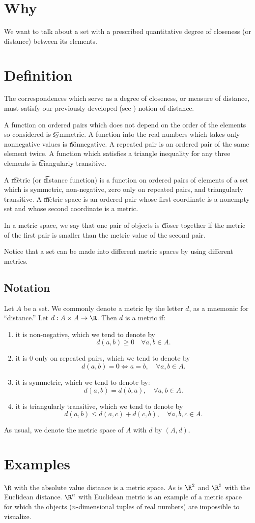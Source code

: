 
\section*{Why}

We want to talk about a set with a prescribed quantitative degree of closeness (or distance) between its elements.

\section*{Definition}

The correspondences which serve as a degree of closeness, or measure of distance, must satisfy our previously developed (see ) notion of distance.

A function on ordered pairs which does not depend on the order of the elements so considered is \t{symmetric}.
A function into the real numbers which takes only nonnegative values is \t{nonnegative}.
A repeated pair is an ordered pair of the same element twice.
A function which satisfies a triangle inequality for any three elements is \t{triangularly transitive}.

A \t{metric} (or \t{distance function}) is a function on ordered pairs of elements of a set which is symmetric, non-negative, zero only on repeated pairs, and triangularly transitive.
A \t{metric space} is an ordered pair whose first coordinate is a nonempty set and whose second coordinate is a metric.

In a metric space, we say that one pair of objects is \t{closer} together if the metric of the first pair is smaller than the metric value of the second pair.

Notice that a set can be made into different metric spaces by using different metrics.

\subsection*{Notation}

Let $A$ be a set.
We commonly denote a metric by the letter $d$, as a mnemonic for ``distance.''
Let $d: A \times  A \to \R $.
Then $d$ is a metric if:
    \begin{enumerate}
      \item it is non-negative, which we tend to denote by
\[
d(a, b) \geq 0 \quad \forall a,b \in A.
\]
      \item it is $0$ only on repeated pairs, which we tend to denote by
\[
d(a, b) = 0 \iff a = b, \quad \forall a,b \in A.
\]
      \item it is symmetric, which we tend to denote by:
\[
d(a, b) = d(b, a), \quad \forall a,b \in A.
\]
      \item it is triangularly transitive, which we tend to denote by
\[
d(a, b) \leq d(a, c) + d(c, b), \quad \forall a,b,c \in A.
\]
    \end{enumerate}
As usual, we denote the metric space of $A$ with $d$ by $(A, d)$.

\section*{Examples}

$\R $ with the absolute value distance is a metric space.
As is $\R ^2$ and $\R ^3$ with the Euclidean distance.
$\R ^n$ with Euclidean metric is an example of a metric space for which the objects ($n$-dimensional tuples of real numbers) are impossible to visualize.
